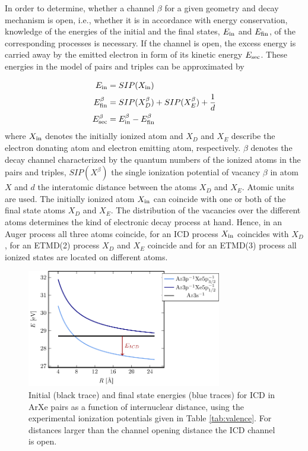 
In order to determine, whether a channel $\beta$ for a given geometry and decay
mechanism is open, i.e., whether it is in accordance with energy conservation,
knowledge of the energies of the initial and the final states, $E_{\rm in}$ and $E_{\rm fin}$, of
the corresponding processes is necessary.
If the channel
is open, the excess energy is carried away by the emitted electron
in form of its kinetic energy $E_{\rm sec}$. These energies in the model
of pairs and triples can be approximated by

\begin{align}
 E_{\rm in}        &= SIP(X_{\rm in}) \label{equation:E_in}\\
 E_{\rm fin}^\beta &= SIP(X_{D}^\beta) + SIP(X_{E}^\beta) + \frac 1d
           \label{equation:E_fin}\\
 E_{\rm sec}^\beta &= E_{\rm in}^\beta - E_{\rm fin}^\beta \label{equation:E_sec}
\end{align}
where $X_{\rm in}$ denotes the initially ionized atom and
$X_{D}$ and $X_{E}$ describe the electron donating atom and electron
emitting atom, respectively.
$\beta$ denotes the decay channel characterized by the quantum numbers of the ionized atoms in the pairs and triples, $SIP(X^\beta)$ the single ionization potential of vacancy $\beta$ in atom $X$ and $d$ the interatomic distance between the atoms $X_{D}$ and $X_{E}$. 
Atomic units are used.
The initially ionized atom $X_{\rm in}$ can
coincide with one or both of
the final state atoms
$X_{D}$ and $X_{E}$.
The distribution of the vacancies over the different
atoms determines the kind of electronic decay process at hand. Hence, in an
Auger process all three atoms coincide, for an ICD process $X_{\rm in}$
coincides with $X_{D}$, for an ETMD(2) process $X_D$ and $X_E$ coincide
and for an ETMD(3) process
all ionized states are located on different atoms.

\begin{figure}[h]
 \centering
 \includegraphics[width=8.5cm]{pics/channel_open_ICD.pdf}
 \caption{Initial (black trace) and final state energies (blue traces) 
          for ICD in ArXe pairs as a function of 
          internuclear distance, using the experimental ionization potentials given
          in Table \ref{tab:valence}. For distances larger than the channel opening
          distance the ICD channel is open.}
 \label{figure:channel_open_ICD}
\end{figure}

